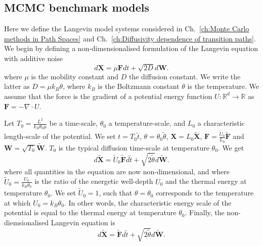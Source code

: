 \documentclass[withindex,glossary,techreport]{cam-thesis}
\begin{document}
\begin{appendices}


\chapter{MCMC benchmark models} \label{app:MCMC benchmark models}

Here we define the Langevin model systems considered in Ch.~\ref{ch:Monte Carlo methods in Path Spaces} and Ch.~\ref{ch:Diffusivity dependence of transition paths}. We begin by defining a non-dimensionalised formulation of the Langevin equation with additive noise
\begin{equation}
d\mathbf{X}=\mu\mathbf{F}dt+\sqrt{2D}d\mathbf{W}.
\end{equation}
where $\mu$ is the mobility constant and $D$ the diffusion constant. We write the latter as $D = \mu k_B \theta$, where $k_B$ is the Boltzmann constant $\theta$ is the temperature. We assume that the force is the gradient of a potential energy function $U : \mathbb{R}^d \to \mathbb{R}$  as $\mathbf{F} = - \nabla \cdot U$.

Let $T_{0}=\frac{L^{2}}{k_{B}\theta_{0}\mu}$ be a time-scale, $\theta_{0}$ a temperature-scale, and $L_0$ a characteristic length-scale of the potential. We set $t=T_{0}\tilde{t}$,
$\theta=\theta_{0}\tilde{\theta}$, $\mathbf{X}=L_0 \tilde{\mathbf{X}}$,
$\mathbf{F}= \frac{\tilde{U}_0}{L_0} \tilde{\mathbf{F}}$ and $\mathbf{W}=\sqrt{T_{0}}\tilde{\mathbf{W}}$. $T_{0}$ is the typical diffusion time-scale at temperature $\theta_{0}$. We get
\begin{equation}
	d\mathbf{\tilde{X}}=\tilde{U}_{0} \tilde{\mathbf{F}}d\tilde{t}+\sqrt{2\tilde{\theta}}d\tilde{\mathbf{W}}.
\end{equation}
where all quantities in the equation are now non-dimensional, and where $\tilde{U}_{0}=\frac{U_{0}}{k_{B}\theta_{0}}$ is the ratio
of the energetic well-depth $U_{0}$ and the thermal energy at temperature $\theta_{0}$. We set $\tilde{U}_0 = 1$, such that $\theta = \theta_0$ corresponds to the temperature at which $U_0 = k_B \theta_0$. In other words, the characteristic energy scale of the potential is equal to the thermal energy at temperature $\theta_0$. Finally, the non-diemsionalised Langevin equation is
\begin{equation}
	d\mathbf{\tilde{X}}= \tilde{\mathbf{F}}d\tilde{t}+\sqrt{2\tilde{\theta}}d\tilde{\mathbf{W}}.
\end{equation}


\end{appendices}
\end{document}
